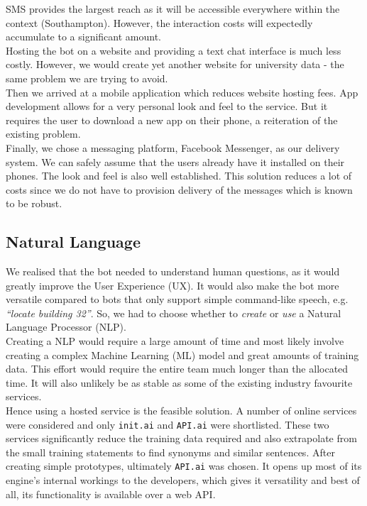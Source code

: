 \documentclass[journal, a4paper]{IEEEtran}
\begin{document}
SMS provides the largest reach as it will be accessible everywhere within the context (Southampton). However, the interaction costs will expectedly accumulate to a significant amount.\\

Hosting the bot on a website and providing a text chat interface is much less costly. However, we would create yet another website for university data - the same problem we are trying to avoid.\\

Then we arrived at a mobile application which reduces website hosting fees. App development allows for a very personal look and feel to the service. But it requires the user to download a new app on their phone, a reiteration of the existing problem.\\

Finally, we chose a messaging platform, Facebook Messenger, as our delivery system. We can safely assume that the users already have it installed on their phones. The look and feel is also well established. This solution reduces a lot of costs since we do not have to provision delivery of the messages which is known to be robust.

\subsection{Natural Language}
We realised that the bot needed to understand human questions, as it would greatly improve the User Experience (UX). It would also make the bot more versatile compared to bots that only support simple command-like speech, e.g. \textit{``locate building 32''}. So, we had to choose whether to \textit{create} or \textit{use} a Natural Language Processor (NLP). \\

Creating a NLP would require a large amount of time and most likely involve creating a complex Machine Learning (ML) model and great amounts of training data. This effort would require the entire team much longer than the allocated time. It will also unlikely be as stable as some of the existing industry favourite services. \\

Hence using a hosted service is the feasible solution. A number of online services were considered and only \texttt{init.ai} and \texttt{API.ai} were shortlisted. These two services significantly reduce the training data required and also extrapolate from the small training statements to find synonyms and similar sentences. After creating simple prototypes, ultimately \texttt{API.ai} was chosen. It opens up most of its engine's internal workings to the developers, which gives it versatility and best of all, its functionality is available over a web API.
\end{document}
